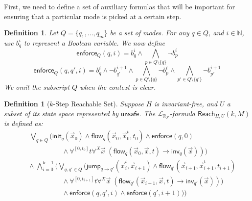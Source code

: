 \documentclass[10pt]{article}
\theoremstyle{plain}
\newtheorem{definition}[theorem]{Definition}
\theoremstyle{definition}
\newcommand{\flow}{\mathsf{flow}}
\newcommand{\jump}{\mathsf{jump}}
\newcommand{\inv}{\mathsf{inv}}
\newcommand{\init}{\mathsf{init}}
\newcommand{\reach}{\mathsf{Reach}}
\newcommand{\unsafe}{\mathsf{unsafe}}
\newcommand{\enforce}{\mathsf{enforce}}
\newcommand{\lrf}{\mathcal{L}_{\mathbb{R}_{\mathcal{F}}}}
\begin{document}
First, we need to define a set of auxiliary formulas that will be important for ensuring that a particular mode is picked at a certain step.
\begin{definition}
Let $Q = \{q_1,...,q_m\}$ be a set of modes. For any $q\in Q$, and $i\in\mathbb{N}$, use  $b_{q}^i$ to represent a Boolean variable. We now define
$$\enforce_Q(q,i) = b^i_{q} \wedge \bigwedge_{p\in Q\setminus\{q\}}\neg b^{i}_{p}$$
$$\enforce_Q(q, q',i) = b^{i}_{q}\wedge \neg b^{i+1}_{q'} \wedge \bigwedge_{p\in Q\setminus\{q\}} \neg b^i_{p} \wedge \bigwedge_{p'\in Q\setminus\{q'\}} \neg b^{i+1}_{p'}$$
We omit the subscript $Q$ when the context is clear.\end{definition}
\begin{definition}[$k$-Step Reachable Set]
Suppose $H$ is invariant-free, and $U$ a subset of its state space represented by $\unsafe$. The $\lrf$-formula $\reach_{H,U}(k,M)$ is defined as:
\begin{eqnarray*}
& &\bigvee_{q\in Q} \Big(\init_{q}(\vec x_{0})\wedge \flow_{q}(\vec x_{0}, \vec x_{0}^t, t_0)\wedge \enforce(q,0)\\
& &\hspace{2cm} \wedge \forall^{[0,t_0]}t\forall^X\vec x\;(\flow_{q}(\vec x_{0}, \vec x, t)\rightarrow \inv_{q}(\vec x))\Big) \\
& &\wedge\; \bigwedge_{i=0}^{k-1}\bigg( \bigvee_{q, q'\in Q} \Big(\jump_{q\rightarrow q'}(\vec
x_{i}^t, \vec x_{i+1})\wedge \flow_{q'}(\vec x_{i+1}, \vec x_{i+1}^t, t_{i+1})\\
& & \hspace{2cm}\wedge \forall^{[0,t_{i+1}]}t\forall^X\vec x\;(\flow_{q'}(\vec x_{i+1}, \vec x,
t)\rightarrow \inv_{q'}(\vec x)) )\\
& &\hspace{2cm}\wedge \enforce(q,q',i)\wedge\enforce(q',i+1)\Big)\bigg)
\end{eqnarray*}
\end{definition}
\end{document}
